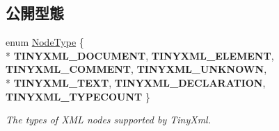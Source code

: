 \subsection*{公開型態}
\begin{DoxyCompactItemize}
\item 
enum \hyperlink{class_ti_xml_node_a836eded4920ab9e9ef28496f48cd95a2}{Node\+Type} \{ \\*
{\bfseries T\+I\+N\+Y\+X\+M\+L\+\_\+\+D\+O\+C\+U\+M\+E\+NT}, 
{\bfseries T\+I\+N\+Y\+X\+M\+L\+\_\+\+E\+L\+E\+M\+E\+NT}, 
{\bfseries T\+I\+N\+Y\+X\+M\+L\+\_\+\+C\+O\+M\+M\+E\+NT}, 
{\bfseries T\+I\+N\+Y\+X\+M\+L\+\_\+\+U\+N\+K\+N\+O\+WN}, 
\\*
{\bfseries T\+I\+N\+Y\+X\+M\+L\+\_\+\+T\+E\+XT}, 
{\bfseries T\+I\+N\+Y\+X\+M\+L\+\_\+\+D\+E\+C\+L\+A\+R\+A\+T\+I\+ON}, 
{\bfseries T\+I\+N\+Y\+X\+M\+L\+\_\+\+T\+Y\+P\+E\+C\+O\+U\+NT}
 \}\begin{DoxyCompactList}\small\item\em The types of X\+ML nodes supported by Tiny\+Xml. \end{DoxyCompactList}
\end{DoxyCompactItemize}
